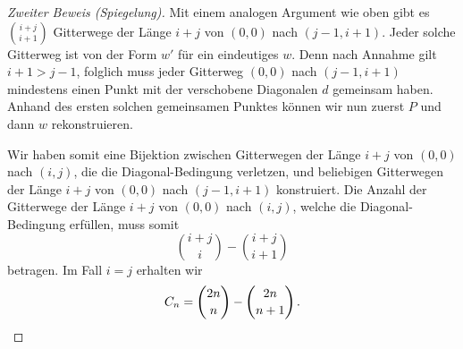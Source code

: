 \begin{proof}[Zweiter Beweis \textmd{(Spiegelung)}]
	Mit einem analogen Argument wie oben gibt es $\binom{i+j}{i+1}$ Gitterwege der Länge $i+j$ von $(0,0)$ nach $(j-1,i+1)$. Jeder solche Gitterweg ist von der Form $w'$ für ein eindeutiges $w$. Denn nach Annahme gilt $i+1>j-1$, folglich muss jeder Gitterweg $(0,0)$ nach $(j-1,i+1)$ mindestens einen Punkt mit der verschobene Diagonalen $d$ gemeinsam haben. Anhand des ersten solchen gemeinsamen Punktes können wir nun zuerst $P$ und dann $w$ rekonstruieren.
	
	Wir haben somit eine Bijektion zwischen Gitterwegen der Länge $i+j$ von $(0,0)$ nach $(i,j)$, die die Diagonal-Bedingung verletzen, und beliebigen Gitterwegen der Länge $i+j$ von $(0,0)$ nach $(j-1,i+1)$ konstruiert. Die Anzahl der Gitterwege der Länge $i+j$ von $(0,0)$ nach $(i,j)$, welche die Diagonal-Bedingung erfüllen, muss somit
	\begin{equation*}
		\binom{i+j}{i}-\binom{i+j}{i+1}
	\end{equation*}
	betragen. Im Fall $i=j$ erhalten wir
	\begin{equation*}
		C_n=\binom{2n}{n}-\binom{2n}{n+1}\,.\qedhere
	\end{equation*}
\end{proof}

